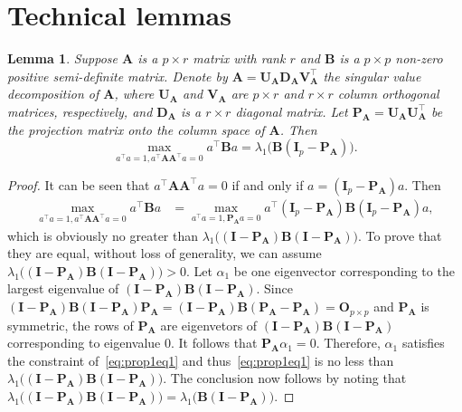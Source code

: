 \documentclass[10pt]{book}
\newtheorem{lemma}{Lemma}
\theoremstyle{definition}
\newcommand{\bA}{\mathbf{A}}
\newcommand{\bB}{\mathbf{B}}
\newcommand{\bP}{\mathbf{P}}
\newcommand{\bO}{\mathbf{O}}
\newcommand{\bI}{\mathbf{I}}
\newcommand{\bU}{\mathbf{U}}
\newcommand{\bD}{\mathbf{D}}
\newcommand{\bV}{\mathbf{V}}
\begin{document}
\section{Technical lemmas}
\setcounter{equation}{0}
\begin{lemma}\label{optProp}
    Suppose $\bA$ is a $p\times r$ matrix with rank $r$ and $\bB$ is a $p\times p$  non-zero positive semi-definite matrix.
    Denote by $\bA=\bU_\bA \bD_\bA \bV_\bA^\top$ the singular value decomposition of $\bA$, where $\bU_\bA$ and $\bV_\bA$ are $p\times r$ and $r\times r$ column orthogonal matrices, respectively, and $\bD_\bA$ is a $r\times r$ diagonal matrix.
    Let $\bP_\bA=\bU_\bA \bU_\bA^\top$ be the projection matrix onto the column space of $\bA$.
    Then
    \begin{equation*}
        \max_{a^\top a=1, a^\top \bA \bA^\top a=0}a^\top \bB a=
        \lambda_{1}\big(\bB(\bI_p-\bP_\bA)\big).
    \end{equation*}
\end{lemma}
\begin{proof}
    It can be seen that $a^\top \bA \bA^\top a=0$ if and only if $a= (\bI_p-\bP_\bA)a$.
    Then
    \begin{equation}\label{eq:prop1eq1}
        \begin{aligned}
        \max_{a^\top a=1, a^\top \bA \bA^\top a=0}a^\top \bB a
            &=
        \max_{a^\top a=1, \bP_\bA a=0}a^\top(\bI_p-\bP_\bA) \bB (\bI_p-\bP_\bA)a,
        \end{aligned}
    \end{equation}
    which is obviously no greater than $\lambda_1 \big((\bI-\bP_\bA)\bB(\bI-\bP_\bA)\big)$.
    To prove that they are equal,  without loss of generality, we can assume $\lambda_{1}\big((\bI-\bP_\bA)\bB(\bI-\bP_\bA)\big)>0$.
    Let $\alpha_1$ be one eigenvector corresponding to the largest eigenvalue of $(\bI-\bP_\bA)\bB(\bI-\bP_\bA)$.
    Since $(\bI-\bP_\bA)\bB(\bI-\bP_\bA)\bP_\bA=(\bI-\bP_\bA)\bB(\bP_\bA-\bP_\bA)=\bO_{p\times p}$ and $\bP_\bA$ is symmetric, the rows of $\bP_\bA$ are eigenvetors of $(\bI-\bP_\bA)\bB(\bI-\bP_\bA)$ corresponding to eigenvalue $0$.
    It follows that $\bP_\bA\alpha_1=0$.
    Therefore, $\alpha_1$ satisfies the constraint of~\eqref{eq:prop1eq1} and thus~\eqref{eq:prop1eq1} is no less than $\lambda_{1}\big((\bI-\bP_\bA)\bB(\bI-\bP_\bA)\big)$.
    The conclusion now follows by noting that $\lambda_{1}\big((\bI-\bP_\bA)\bB(\bI-\bP_\bA)\big)=\lambda_{1}\big( \bB(\bI-\bP_\bA)\big)$.
    
\end{proof}
\end{document}
